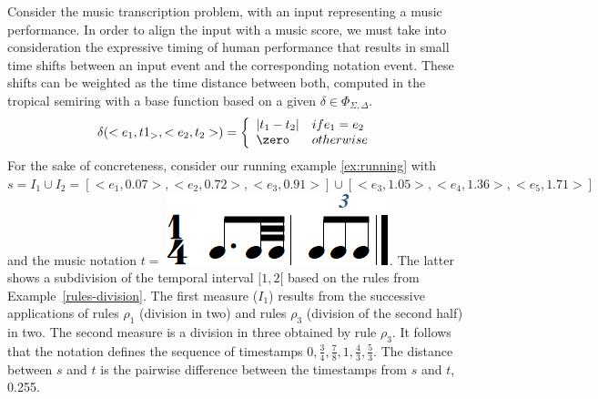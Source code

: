 \begin{example}\label{distance-time}
Consider the music transcription problem, with an input  representing
a music performance. In order to align the
input with a music score, we must take into consideration
the expressive timing of human performance that
results in small time shifts between an input event and the corresponding
notation event.  These shifts can be weighted as the time distance between both,
computed in the tropical semiring with a base function
based on a given $\delta \in \Phi_{\Sigma, \Delta}$.
$$\delta(<e_1, t1_>, <e_2, t_2>) =
\left\{
\begin{array}{ll}
   | t_1 - t_2 | & if e_1 = e_2 \\
   \zero  & otherwise
\end{array}
\right.$$
For the sake of concreteness, consider our running example \ref{ex:running} with $s = I_1 \cup I_2 =
 [ <e_1, 0.07>,<e_2, 0.72>,<e_3, 0.91>] \cup [ <e_3, 1.05>,<e_4, 1.36>,<e_5, 1.71>]$
 and the music notation $t =$ \includegraphics[scale=0.20]{pictures/score5.png}.
 The latter shows a subdivision of the temporal interval $[1, 2[$
 based on the rules from Example~\ref{rules-division}. The first measure ($I_1$)
 results from the successive applications of  rules $\rho_1$ (division in two)
and rules $\rho_3$ (division of the second half) in two. The second measure
is a division in three obtained by rule $\rho_3$. It follows that the notation
defines the sequence of timestamps $0, \frac{3}{4}, \frac{7}{8}, 1, \frac{4}{3}, \frac{5}{3}$.
The distance between $s$ and $t$ is the  pairwise difference between the
timestamps from $s$ and $t$, 0.255.
\endex
\end{example}
